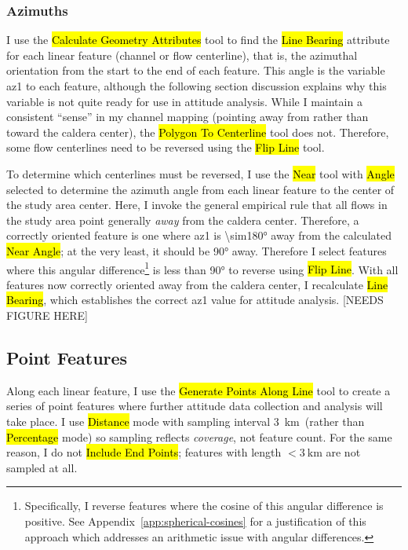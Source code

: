 \subsubsection{Azimuths}

I use the \hl{Calculate Geometry Attributes} tool to find the \hl{Line Bearing} attribute for each linear feature (channel or flow centerline), that is, the azimuthal orientation from the start to the end of each feature. This angle is the variable \acf{az1} to each feature, although the following section discussion explains why this variable is not quite ready for use in attitude analysis. While I maintain a consistent ``sense'' in my channel mapping (pointing away from rather than toward the caldera center), the \hl{Polygon To Centerline} tool does not. Therefore, some flow centerlines need to be reversed using the \hl{Flip Line} tool.

To determine which centerlines must be reversed, I use the \hl{Near} tool with \hl{Angle} selected to determine the azimuth angle from each linear feature to the center of the study area \acs{center}. Here, I invoke the general empirical rule that all flows in the study area point generally \emph{away} from the caldera center. Therefore, a correctly oriented feature is one where \acs{az1} is \ang{\sim180} away from the calculated \hl{Near Angle}; at the very least, it should be \ang{90} away. Therefore I select features where this angular difference\footnote{Specifically, I reverse features where the cosine of this angular difference is positive. See Appendix~\ref{app:spherical-cosines} for a justification of this approach which addresses an arithmetic issue with angular differences.} is less than \ang{90} to reverse using \hl{Flip Line}. With all features now correctly oriented away from the caldera center, I recalculate \hl{Line Bearing}, which establishes the correct \acf{az1} value for attitude analysis. [NEEDS FIGURE HERE]

\subsection{Point Features}

\newcommand{\samplinginterval}{\qty{3}{\km}}

Along each linear feature, I use the \hl{Generate Points Along Line} tool to create a series of point features where further attitude data collection and analysis will take place. I use \hl{Distance} mode with sampling interval \samplinginterval\ (rather than \hl{Percentage} mode) so sampling reflects \emph{coverage}, not feature count. For the same reason, I do not \hl{Include End Points}; features with length $<\samplinginterval$ are not sampled at all.

